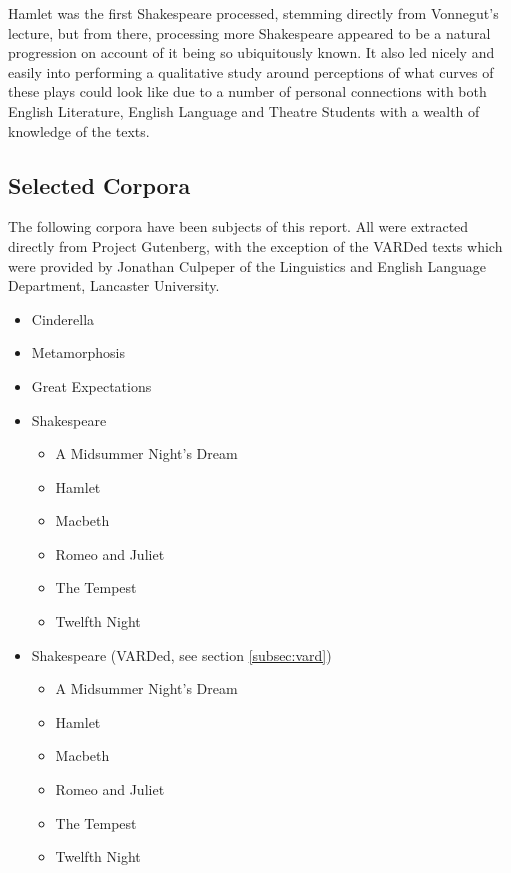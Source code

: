 \documentclass{article}
\begin{document}
    Hamlet was the first Shakespeare processed, stemming directly from Vonnegut's lecture, but from there, processing more Shakespeare appeared to be a natural progression on account of it being so ubiquitously known. It also led nicely and easily into performing a qualitative study around perceptions of what curves of these plays could look like due to a number of personal connections with both English Literature, English Language and Theatre Students with a wealth of knowledge of the texts.
    
    \subsection{Selected Corpora}
    The following corpora have been subjects of this report. All were extracted directly from Project Gutenberg, with the exception of the VARDed texts which were provided by Jonathan Culpeper of the Linguistics and English Language Department, Lancaster University.
        \begin{itemize}
            \item Cinderella
            \item Metamorphosis
            \item Great Expectations
            \item Shakespeare
            \begin{itemize}
                \item A Midsummer Night's Dream
                \item Hamlet
                \item Macbeth
                \item Romeo and Juliet
                \item The Tempest
                \item Twelfth Night
            \end{itemize}
            \item Shakespeare (VARDed, see section \ref{subsec:vard})
            \begin{itemize}
                \item A Midsummer Night's Dream
                \item Hamlet
                \item Macbeth
                \item Romeo and Juliet
                \item The Tempest
                \item Twelfth Night
            \end{itemize}
        \end{itemize}
\end{document}

